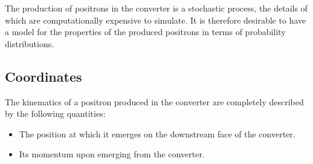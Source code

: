 \documentclass[12pt]{article}
\begin{document}
The production of positrons in the converter is a stochastic process, the details of which are computationally expensive to simulate.
It is therefore desirable to have a model for the properties of the produced positrons in terms of probability distributions.

\subsection{Coordinates}
The kinematics of a positron produced in the converter are completely described by the following quantities:
\begin{itemize}
\item
The position at which it emerges on the downstream face of the converter.

\item
Its momentum upon emerging from the converter.

\end{itemize}
\end{document}

